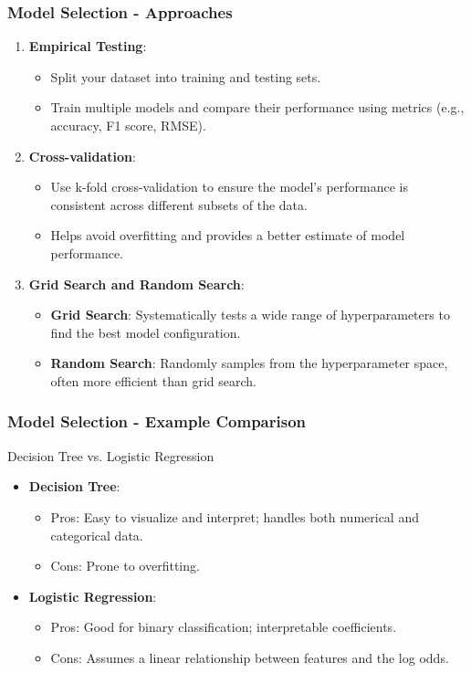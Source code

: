 \documentclass[aspectratio=169]{beamer}
\begin{document}
\begin{frame}[fragile]
    \frametitle{Model Selection - Approaches}
    \begin{enumerate}
        \item \textbf{Empirical Testing}:
            \begin{itemize}
                \item Split your dataset into training and testing sets.
                \item Train multiple models and compare their performance using metrics (e.g., accuracy, F1 score, RMSE).
            \end{itemize}
        \item \textbf{Cross-validation}:
            \begin{itemize}
                \item Use k-fold cross-validation to ensure the model’s performance is consistent across different subsets of the data.
                \item Helps avoid overfitting and provides a better estimate of model performance.
            \end{itemize}
        \item \textbf{Grid Search and Random Search}:
            \begin{itemize}
                \item \textbf{Grid Search}: Systematically tests a wide range of hyperparameters to find the best model configuration.
                \item \textbf{Random Search}: Randomly samples from the hyperparameter space, often more efficient than grid search.
            \end{itemize}
    \end{enumerate}
\end{frame}

\begin{frame}[fragile]
    \frametitle{Model Selection - Example Comparison}
    \begin{block}{Decision Tree vs. Logistic Regression}
        \begin{itemize}
            \item \textbf{Decision Tree}:
                \begin{itemize}
                    \item Pros: Easy to visualize and interpret; handles both numerical and categorical data.
                    \item Cons: Prone to overfitting.
                \end{itemize}
            \item \textbf{Logistic Regression}:
                \begin{itemize}
                    \item Pros: Good for binary classification; interpretable coefficients.
                    \item Cons: Assumes a linear relationship between features and the log odds.
                \end{itemize}
        \end{itemize}
    \end{block}
\end{frame}
\end{document}
